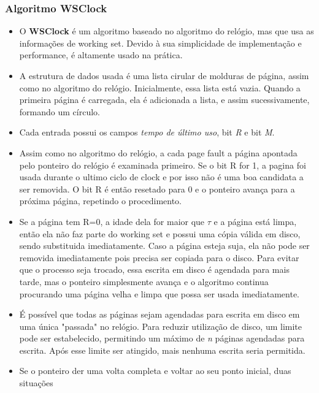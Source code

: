 \documentclass[10pt]{article}
\begin{document}
\subsubsection{Algoritmo WSClock}
\begin{itemize}
    \item O \textbf{WSClock} é um algoritmo baseado no algoritmo do relógio, mas que usa
        as informações de working set. Devido à sua simplicidade de implementação e 
        performance, é altamente usado na prática.
    \item A estrutura de dados usada é uma lista cirular de molduras de página, assim
        como no algoritmo do relógio. Inicialmente, essa lista está vazia. Quando a primeira
        página é carregada, ela é adicionada a lista, e assim sucessivamente, formando um 
        círculo.
    \item Cada entrada possui os campos \textit{tempo de último uso}, bit \textit{R}
        e bit \textit{M}. 
    \item Assim como no algoritmo do relógio, a cada page fault a página apontada pelo
        ponteiro do relógio é examinada primeiro. Se o bit R for 1, a pagina foi usada
        durante o ultimo ciclo de clock e por isso não é uma boa candidata a ser removida.
        O bit R é então resetado para 0 e o ponteiro avança para a próxima página, repetindo
        o procedimento. 
    \item Se a página tem R=0, a idade dela for maior que \begin{math}\tau\end{math} e a 
        página está limpa, então ela não faz parte do working set e possui uma cópia válida
        em disco, sendo substituida imediatamente. Caso a página esteja suja, ela não pode
        ser removida imediatamente pois precisa ser copiada para o disco. Para evitar que 
        o processo seja trocado, essa escrita em disco é agendada para mais tarde, mas
        o ponteiro simplesmente avança e o algoritmo continua procurando uma página velha
        e limpa que possa ser usada imediatamente.
    \item É possível que todas as páginas sejam agendadas para escrita em disco em uma única
        "passada" no relógio. Para reduzir utilização de disco, um limite pode ser estabelecido,
        permitindo um máximo de \textit{n} páginas agendadas para escrita. Após esse limite
        ser atingido, mais nenhuma escrita seria permitida. 
    \item Se o ponteiro der uma volta completa e voltar ao seu ponto inicial, duas situações

\end{itemize}
\end{document}
